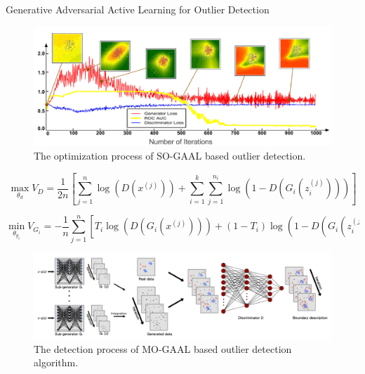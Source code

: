 \documentclass[final]{beamer}
\newlength{\colwidth}
\begin{document}
\begin{frame}[t]
\begin{columns}[t]
\begin{column}{\colwidth}
\begin{exampleblock}{Generative Adversarial Active Learning for Outlier Detection}
    \begin{figure}
  	   \centering
  	   \includegraphics[scale=0.9]{figures/process of SO-GAAL.png}
  	   \caption{The optimization process of SO-GAAL based outlier detection.}
    \end{figure}
  	
  	
    $$
    \max_{\theta_d}V_D=\frac{1}{2n}[\sum_{j=1}^{n}\log(D(x^{(j)})) + \sum_{i=1}^{k}\sum_{j=1}^{n_i}\log(1-D(G_i(z_i^{(j)})))]
    $$
    
    $$
    \min_{\theta_{g_i}}V_{G_i}=-\frac{1}{n}\sum_{j=1}^{n}[T_i\log(D(G_i(x^{(j)}))) + (1-T_i)\log(1-D(G_i(z_i^{(j)})))]
    $$
    
    \begin{figure}
    	\centering
    	\includegraphics{figures/MO-GAAL.png}
    	\caption{The detection process of MO-GAAL based outlier detection algorithm.}
    \end{figure}


\end{exampleblock}
\end{column}
\end{columns}
\end{frame}
\end{document}
